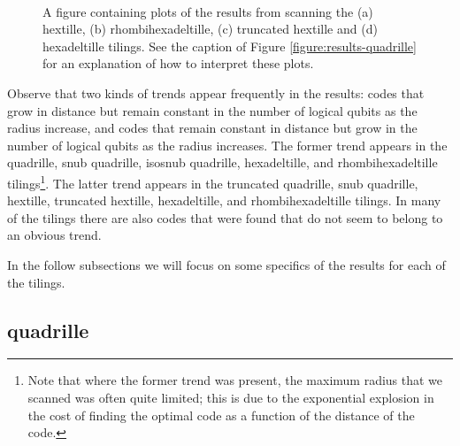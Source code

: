 \documentclass{amsbook}
\theoremstyle{plain}
\theoremstyle{definition}
\theoremstyle{remark}
\begin{document}
\begin{figure}
\hspace{1.67in}
 \\
\caption{
\label{figure:results-hextille}
A figure containing plots of the results from scanning the (a) hextille, (b) rhombihexadeltille, (c) truncated hextille and (d) hexadeltille tilings.  See the caption of Figure \ref{figure:results-quadrille} for an explanation of how to interpret these plots.
}
\end{figure}

Observe that two kinds of trends appear frequently in the results:  codes that grow in distance but remain constant in the number of logical qubits as the radius increase, and codes that remain constant in distance but grow in the number of logical qubits as the radius increases.  The former trend appears in the quadrille, snub quadrille, isosnub quadrille, hexadeltille, and rhombihexadeltille tilings\footnote{Note that where the former trend was present, the maximum radius that we scanned was often quite limited;  this is due to the exponential explosion in the cost of finding the optimal code as a function of the distance of the code.}.  The latter trend appears in the truncated quadrille, snub quadrille, hextille, truncated hextille, hexadeltille, and rhombihexadeltille tilings.  In many of the tilings there are also codes that were found that do not seem to belong to an obvious trend.

In the follow subsections we will focus on some specifics of the results for each of the tilings.

\subsection{quadrille}
\end{document}
